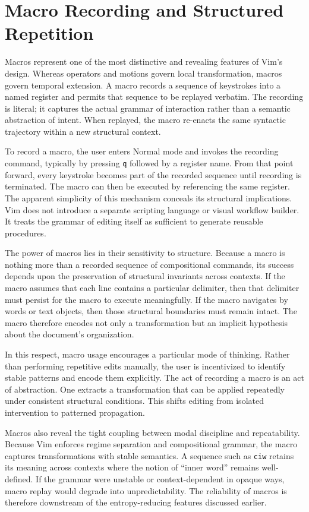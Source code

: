 \documentclass[12pt]{article}
\begin{document}
\section{Macro Recording and Structured Repetition}

Macros represent one of the most distinctive and revealing features of Vim’s design. Whereas operators and motions govern local transformation, macros govern temporal extension. A macro records a sequence of keystrokes into a named register and permits that sequence to be replayed verbatim. The recording is literal; it captures the actual grammar of interaction rather than a semantic abstraction of intent. When replayed, the macro re-enacts the same syntactic trajectory within a new structural context.

To record a macro, the user enters Normal mode and invokes the recording command, typically by pressing \texttt{q} followed by a register name. From that point forward, every keystroke becomes part of the recorded sequence until recording is terminated. The macro can then be executed by referencing the same register. The apparent simplicity of this mechanism conceals its structural implications. Vim does not introduce a separate scripting language or visual workflow builder. It treats the grammar of editing itself as sufficient to generate reusable procedures.

The power of macros lies in their sensitivity to structure. Because a macro is nothing more than a recorded sequence of compositional commands, its success depends upon the preservation of structural invariants across contexts. If the macro assumes that each line contains a particular delimiter, then that delimiter must persist for the macro to execute meaningfully. If the macro navigates by words or text objects, then those structural boundaries must remain intact. The macro therefore encodes not only a transformation but an implicit hypothesis about the document’s organization.

In this respect, macro usage encourages a particular mode of thinking. Rather than performing repetitive edits manually, the user is incentivized to identify stable patterns and encode them explicitly. The act of recording a macro is an act of abstraction. One extracts a transformation that can be applied repeatedly under consistent structural conditions. This shifts editing from isolated intervention to patterned propagation.

Macros also reveal the tight coupling between modal discipline and repeatability. Because Vim enforces regime separation and compositional grammar, the macro captures transformations with stable semantics. A sequence such as \texttt{ciw} retains its meaning across contexts where the notion of “inner word” remains well-defined. If the grammar were unstable or context-dependent in opaque ways, macro replay would degrade into unpredictability. The reliability of macros is therefore downstream of the entropy-reducing features discussed earlier.
\end{document}
